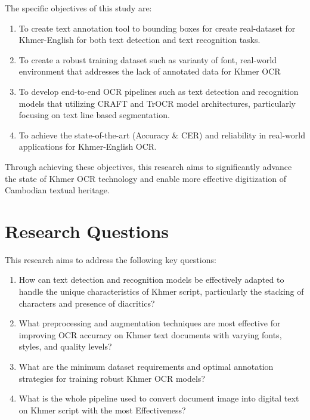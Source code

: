 The specific objectives of this study are:

\begin{enumerate}
    \item To create text annotation tool to bounding boxes for create real-dataset for Khmer-English for both text detection and text recognition tasks.
    \item To create a robust training dataset such as varianty of font, real-world environment that addresses the lack of annotated data for Khmer OCR
    \item To develop end-to-end OCR pipelines such as text detection and recognition models that utilizing CRAFT and TrOCR model architectures, particularly focusing on text line based segmentation.
    \item To achieve the state-of-the-art (Accuracy \& CER) and reliability in real-world applications for Khmer-English OCR.
\end{enumerate}

Through achieving these objectives, this research aims to significantly advance the state of Khmer OCR technology and enable more effective digitization of Cambodian textual heritage.

\section{Research Questions}
\label{sec:questions}

This research aims to address the following key questions:

\begin{enumerate}
    \item How can text detection and recognition models be effectively adapted to handle the unique characteristics of Khmer script, particularly the stacking of characters and presence of diacritics?
    
    \item What preprocessing and augmentation techniques are most effective for improving OCR accuracy on Khmer text documents with varying fonts, styles, and quality levels?

    \item What are the minimum dataset requirements and optimal annotation strategies for training robust Khmer OCR models?
    
    \item What is the whole pipeline used to convert document image into digital text on Khmer script with the most Effectiveness?
\end{enumerate}

